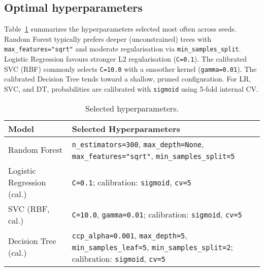 \documentclass[conference]{IEEEtran}
\begin{document}
\subsection{Optimal hyperparameters}

Table~\ref{tab:best-hparams} summarizes the hyperparameters selected most often across seeds. Random Forest typically prefers deeper (unconstrained) trees with \texttt{max\_features="sqrt"} and moderate regularisation via \texttt{min\_samples\_split}. Logistic Regression favours stronger L2 regularisation (\texttt{C=0.1}). The calibrated SVC (RBF) commonly selects \texttt{C=10.0} with a smoother kernel (\texttt{gamma=0.01}). The calibrated Decision Tree tends toward a shallow, pruned configuration. For LR, SVC, and DT, probabilities are calibrated with \texttt{sigmoid} using 5-fold internal CV.

\begin{table}[h]
\centering
\footnotesize
\setlength{\tabcolsep}{4pt}
\caption{Selected hyperparameters.}
\label{tab:best-hparams}
\begin{tabularx}{\columnwidth}{l X}
\toprule
\textbf{Model} & \textbf{Selected Hyperparameters} \\
\midrule
Random Forest &
\texttt{n\_estimators=300}, \texttt{max\_depth=None}, \texttt{max\_features="sqrt"}, \texttt{min\_samples\_split=5} \\
Logistic Regression (cal.) &
\texttt{C=0.1}; calibration: \texttt{sigmoid}, \texttt{cv=5} \\
SVC (RBF, cal.) &
\texttt{C=10.0}, \texttt{gamma=0.01}; calibration: \texttt{sigmoid}, \texttt{cv=5} \\
Decision Tree (cal.) &
\texttt{ccp\_alpha=0.001}, \texttt{max\_depth=5}, \texttt{min\_samples\_leaf=5}, \texttt{min\_samples\_split=2}; calibration: \texttt{sigmoid}, \texttt{cv=5} \\
\bottomrule
\end{tabularx}
\end{table}
\end{document}
